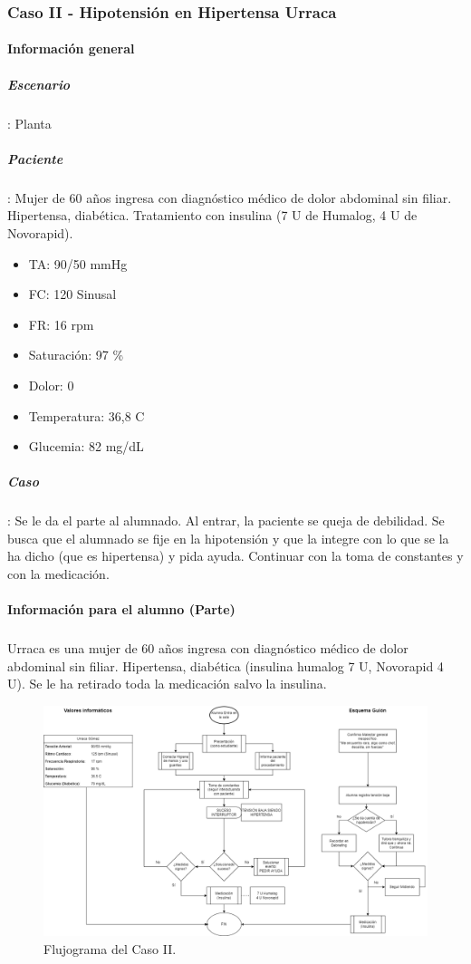 \subsubsection{Caso II - Hipotensión en Hipertensa Urraca}
\begin{multicols}{2}
    \paragraph{Información general}
    \subparagraph{Escenario}: Planta
    \subparagraph{Paciente}: Mujer de 60 años ingresa con diagnóstico médico de dolor abdominal sin filiar. Hipertensa, diabética. Tratamiento con insulina (7 U de Humalog, 4 U de Novorapid).
    \begin{itemize}[topsep=0pt, partopsep=0pt,itemsep=0pt,parsep=0pt]
        \item TA: 90/50 mmHg
        \item FC: 120 Sinusal
        \item FR: 16 rpm
        \item Saturación: 97 \%
        \item Dolor: 0
        \item Temperatura: 36,8 C
        \item Glucemia: 82 mg/dL
    \end{itemize}
    \subparagraph{Caso}: Se le da el parte al alumnado. Al entrar, la paciente se queja de debilidad. Se busca que el alumnado se fije en la hipotensión y que la integre con lo que se la ha dicho (que es hipertensa) y pida ayuda. Continuar con la toma de constantes y con la medicación.
    \columnbreak
    \paragraph{Información para el alumno (Parte)}
    \subparagraph{} Urraca es una mujer de 60 años ingresa con diagnóstico médico de dolor abdominal sin filiar. Hipertensa, diabética (insulina humalog 7 U, Novorapid 4 U). Se le ha retirado toda la medicación salvo la insulina.
\end{multicols}
\begin{figure}[H]
    \centering
	\includegraphics[width=\textwidth]{./imagenes/ACV-AdSC-CasoIIDiagramaFlujoIIEnf.png}
	\caption{\label{fig:PlanXVII:CasoII}Flujograma del Caso II.}
\end{figure}
\clearpage
